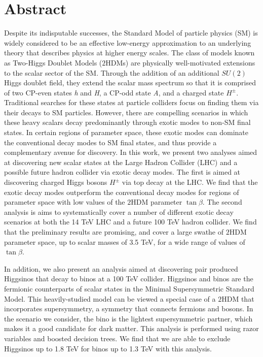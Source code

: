 \chapter*{Abstract}
{}
Despite its indisputable successes, the Standard Model of particle physics (SM) is widely considered to be an effective low-energy approximation to an underlying theory that describes physics at higher energy scales. 
The class of models known as Two-Higgs Doublet Models ($2$HDMs) are physically well-motivated extensions to the scalar sector of the SM. Through the addition of an additional $SU(2)$ Higgs doublet field, they extend the scalar mass spectrum so that it is comprised of two CP-even states \emph{h} and \emph{H}, a CP-odd state \emph{A}, and a charged state $H^\pm$.
Traditional searches for these states at particle colliders focus on finding them via their decays to SM particles. However, there are compelling scenarios in which these heavy scalars decay predominantly through exotic modes to non-SM final states. In certain regions of parameter space, these exotic modes can dominate the conventional decay modes to SM final states, and thus provide a complementary avenue for discovery. In this work, we present two analyses aimed at discovering new scalar states at the Large Hadron Collider (LHC) and a possible future hadron collider via exotic decay modes. The first is aimed at discovering charged Higgs bosons $H^\pm$ via top decay at the LHC. We find that the exotic decay modes outperform the conventional decay modes for regions of parameter space with low values of the $2$HDM parameter $\tan\beta$. The second analysis is aims to systematically cover a number of different exotic decay scenarios at both the 14 TeV LHC and a future 100 TeV hadron collider. We find that the preliminary results are promising, and cover a large swathe of $2$HDM parameter space, up to scalar masses of 3.5 TeV, for a wide range of values of $\tan\beta$.

In addition, we also present an analysis aimed at discovering pair produced Higgsinos that decay to binos at a 100 TeV collider. Higgsinos and binos are the fermionic counterparts of scalar states in the Minimal Supersymmetric Standard Model. This heavily-studied model can be viewed a special case of a $2$HDM that incorporates supersymmetry, a symmetry that connects fermions and bosons. In the scenario we consider, the bino is the lightest supersymmetric partner, which makes it a good candidate for dark matter. This analysis is performed using razor variables and boosted decision trees. We find that we are able to exclude Higgsinos up to 1.8 TeV for binos up to 1.3 TeV with this analysis.
